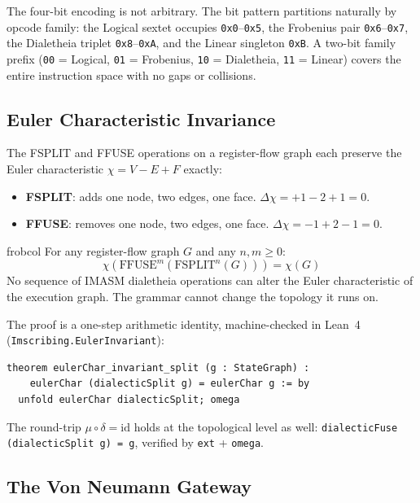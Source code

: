 \documentclass[12pt,a4paper]{article}
\begin{document}
The four-bit encoding is not arbitrary. The bit pattern partitions naturally
by opcode family: the Logical sextet occupies \texttt{0x0}--\texttt{0x5}, the
Frobenius pair \texttt{0x6}--\texttt{0x7}, the Dialetheia triplet
\texttt{0x8}--\texttt{0xA}, and the Linear singleton \texttt{0xB}. A two-bit
family prefix (\texttt{00} = Logical, \texttt{01} = Frobenius,
\texttt{10} = Dialetheia, \texttt{11} = Linear) covers the entire instruction
space with no gaps or collisions.

\subsection{Euler Characteristic Invariance}

The FSPLIT and FFUSE operations on a register-flow graph each preserve the
Euler characteristic $\chi = V - E + F$ exactly:

\begin{itemize}
\item \textbf{FSPLIT}: adds one node, two edges, one face.
  $\Delta\chi = +1 - 2 + 1 = 0$.
\item \textbf{FFUSE}: removes one node, two edges, one face.
  $\Delta\chi = -1 + 2 - 1 = 0$.
\end{itemize}

\begin{admonitionbox}{frobcol}
For any register-flow graph $G$ and any $n, m \geq 0$:
\[
  \chi\!\left(\mathrm{FFUSE}^m(\mathrm{FSPLIT}^n(G))\right) = \chi(G)
\]
No sequence of IMASM dialetheia operations can alter the Euler characteristic
of the execution graph. The grammar cannot change the topology it runs on.
\end{admonitionbox}

The proof is a one-step arithmetic identity, machine-checked in Lean~4
(\texttt{Imscribing.EulerInvariant}):

\begin{lstlisting}[language={}]
theorem eulerChar_invariant_split (g : StateGraph) :
    eulerChar (dialecticSplit g) = eulerChar g := by
  unfold eulerChar dialecticSplit; omega
\end{lstlisting}

The round-trip $\mu \circ \delta = \mathrm{id}$ holds at the topological
level as well: \texttt{dialecticFuse (dialecticSplit g) = g}, verified by
\texttt{ext} + \texttt{omega}.

\subsection{The Von Neumann Gateway}
\end{document}
